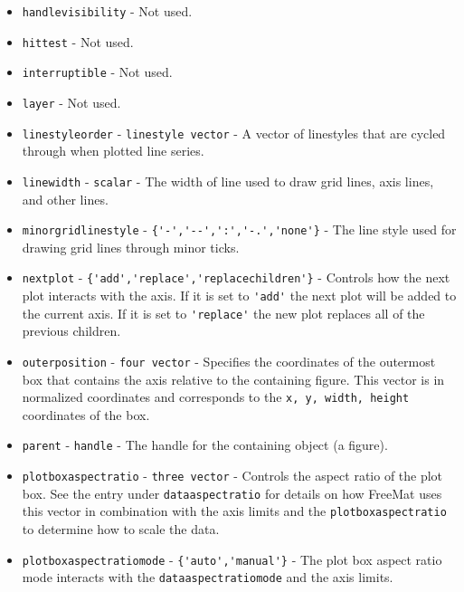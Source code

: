 \begin{itemize}
\item  \verb|handlevisibility| - Not used.

\item  \verb|hittest| - Not used.

\item  \verb|interruptible| - Not used.

\item  \verb|layer| - Not used.

\item  \verb|linestyleorder| - \verb|linestyle vector| - A vector of linestyles that are cycled
 through when plotted line series.

\item  \verb|linewidth| - \verb|scalar| - The width of line used to draw grid lines, axis lines, 
 and other lines.

\item  \verb|minorgridlinestyle| - \verb|{'-','--',':','-.','none'}| - The line style used for
 drawing grid lines through minor ticks.

\item  \verb|nextplot| - \verb|{'add','replace','replacechildren'}| - Controls how the next plot
 interacts with the axis.  If it is set to \verb|'add'| the next plot will be added to the
 current axis.  If it is set to \verb|'replace'| the new plot replaces all of the previous
 children.

\item  \verb|outerposition| - \verb|four vector| - Specifies the coordinates of the outermost
 box that contains the axis relative to the containing figure.  This vector is in normalized
 coordinates and corresponds to the \verb|x, y, width, height| coordinates of the box.

\item  \verb|parent| - \verb|handle| - The handle for the containing object (a figure).

\item  \verb|plotboxaspectratio| - \verb|three vector| - Controls the aspect ratio of the plot
 box.  See the entry under \verb|dataaspectratio| for details on how FreeMat uses this
 vector in combination with the axis limits and the \verb|plotboxaspectratio| to determine
 how to scale the data. 

\item  \verb|plotboxaspectratiomode| - \verb|{'auto','manual'}| - The plot box aspect ratio mode
 interacts with the \verb|dataaspectratiomode| and the axis limits.


\end{itemize}
